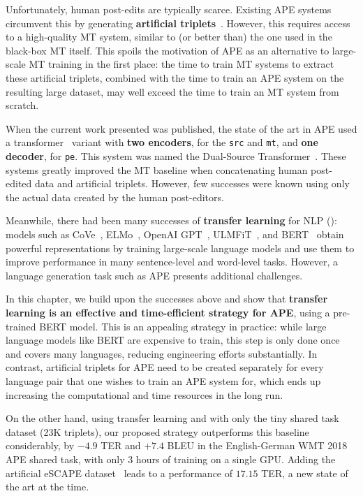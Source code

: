 Unfortunately, human post-edits are typically scarce. Existing APE
systems circumvent this by generating {\bf artificial
        triplets}~\citep{junczys2016log, negri2018escape}. However, this
requires access to a high-quality MT system, similar to (or better
than) the one used in the black-box MT itself. This spoils the
motivation of APE as an alternative to large-scale MT training in the
first place: the time to train MT systems to extract these artificial
triplets, combined with the time to train an APE system on the
resulting large dataset, may well exceed the time to train an MT
system from scratch.

When the current work presented was published, the state of the art
in APE used a transformer~\citep{vaswani2017attention} variant with
    {\bf two encoders}, for the {\tt src} and {\tt mt}, and {\bf one
        decoder}, for {\tt pe}. This system was named the Dual-Source
Transformer~\citep{junczys2018ms, tebbifakhr2018multi}. These systems
greatly improved the MT baseline when concatenating human post-edited
data and artificial triplets. However, few successes were known using
only the actual data created by the human post-editors.

Meanwhile, there had been many successes of {\bf transfer learning}
for NLP (): models such as CoVe~\citep{mccann2017learned},
ELMo~\citep{peters2018deep}, OpenAI GPT~\citep{radford2018improving},
ULMFiT~\citep{howard2018universal}, and BERT~\citep{devlin2018bert}
obtain powerful representations by training large-scale language
models and use them to improve performance in many sentence-level and
word-level tasks. However, a language generation task such as APE
presents additional challenges.

In this chapter, we build upon the successes above and show that {\bf
        transfer learning is an effective and time-efficient strategy for
        APE}, using a pre-trained BERT model. This is an appealing strategy
in practice: while large language models like BERT are expensive to
train, this step is only done once and covers many languages,
reducing engineering efforts substantially. In contrast, artificial
triplets for APE need to be created separately for every language
pair that one wishes to train an APE system for, which ends up
increasing the computational and time resources in the long run.

On the other hand, using transfer learning and with only the tiny shared
task dataset (23K triplets), our proposed strategy outperforms this
baseline considerably, by $-4.9$ TER and $+7.4$ BLEU in the
English-German WMT 2018 APE shared task, with only 3 hours of training on
a single GPU. Adding the artificial eSCAPE
dataset~\citep{negri2018escape} leads to a performance of $17.15$ TER,
a new state of the art at the time.


